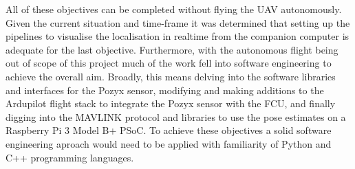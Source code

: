 All of these objectives can be completed without flying the UAV autonomously.
Given the current situation and time-frame it was determined that setting up the pipelines to visualise the localisation in realtime from the companion computer is adequate for the last objective.
Furthermore, with the autonomous flight being out of scope of this project much of the work fell into software engineering to achieve the overall aim.
Broadly, this means delving into the software libraries and interfaces for the Pozyx sensor, modifying and making additions to the Ardupilot flight stack to integrate the Pozyx sensor with the FCU,
and finally digging into the MAVLINK protocol and libraries to use the pose estimates on a Raspberry Pi 3 Model B+ PSoC.
To achieve these objectives a solid software engineering aproach would need to be applied with familiarity of Python and C++ programming languages.

